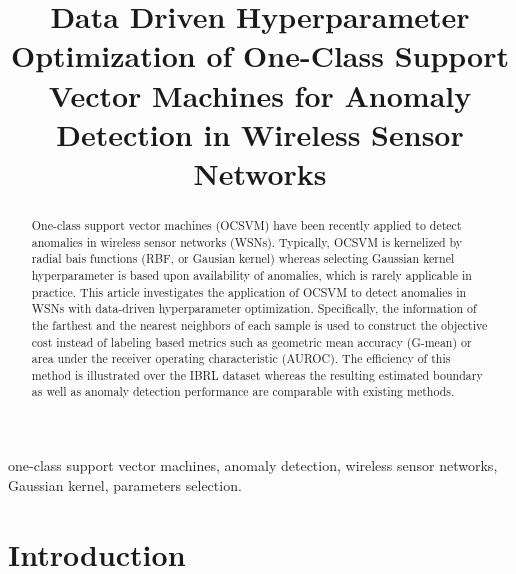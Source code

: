 \documentclass[conference]{IEEEtran}
\begin{document}
\title{Data Driven Hyperparameter Optimization of One-Class Support Vector Machines for Anomaly Detection in Wireless Sensor Networks}

\author{
\and
{}
}

\maketitle

\begin{abstract}
One-class support vector machines (OCSVM) have been recently applied to detect anomalies in wireless sensor networks (WSNs). Typically, OCSVM is kernelized by radial bais functions (RBF, or Gausian kernel) whereas selecting Gaussian kernel hyperparameter is based upon availability of anomalies, which is rarely applicable in practice. This article investigates the application of OCSVM to detect anomalies in WSNs with data-driven hyperparameter optimization. Specifically, the information of the farthest and the nearest neighbors of each sample is used to construct the objective cost instead of labeling based metrics such as geometric mean accuracy (G-mean) or area under the receiver operating characteristic (AUROC). The efficiency of this method is illustrated over the IBRL dataset whereas the resulting estimated boundary as well as anomaly detection performance are comparable with existing methods. 
\end{abstract}

\begin{IEEEkeywords}
one-class support vector machines,  anomaly detection, wireless sensor networks, Gaussian kernel, parameters selection.
\end{IEEEkeywords}

\IEEEpeerreviewmaketitle

\section{Introduction}
\end{document}
